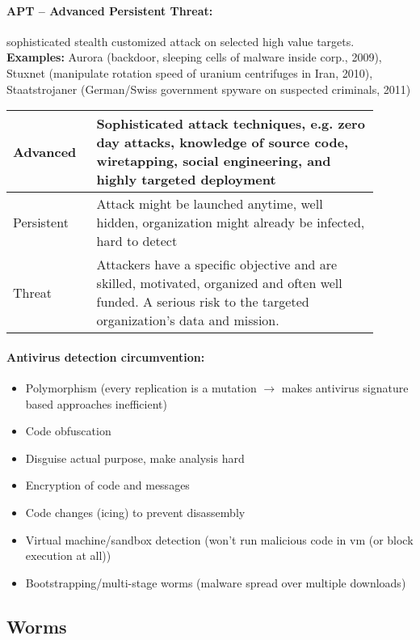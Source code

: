 \paragraph{APT -- Advanced Persistent Threat:} sophisticated stealth customized attack on selected high value targets.\\
\textbf{Examples:} Aurora (backdoor, sleeping cells of malware inside corp., 2009), Stuxnet (manipulate rotation speed of uranium centrifuges in Iran, 2010), Staatstrojaner (German/Swiss government spyware on suspected criminals, 2011)

\begin{tabular}{p{0.2\linewidth}p{0.7\linewidth}}
Advanced & Sophisticated attack techniques, e.g. zero
day attacks, knowledge of source code, wiretapping, social
engineering, and highly targeted deployment \\
\hline
Persistent & Attack might be launched anytime, well hidden, organization might already be infected, hard to detect \\
\hline
Threat & Attackers have a specific objective and are skilled,
motivated, organized and often well funded. A serious risk to the targeted organization's data and mission. \\
\end{tabular}

\paragraph{Antivirus detection circumvention:}
\begin{itemize}
\item Polymorphism (every replication is a mutation $\to$ makes antivirus signature based approaches inefficient)
\item Code obfuscation
\item Disguise actual purpose, make analysis hard
\item Encryption of code and messages
\item Code changes (icing) to prevent disassembly
\item Virtual machine/sandbox detection (won't run malicious code in vm (or block execution at all))
\item Bootstrapping/multi-stage worms (malware spread over multiple downloads)
\end{itemize}

\subsection{Worms}

